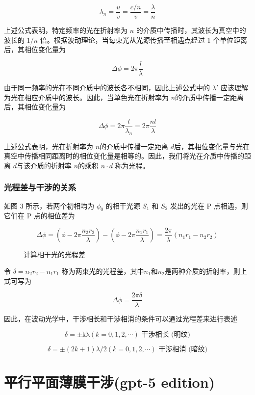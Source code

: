 \documentclass[withoutpreface,bwprint]{cumcmthesis} %
\begin{document}
\[\lambda_{n} = \frac{u}{v} = \frac{c/n}{v} = \frac{\lambda}{n}\]

上述公式表明，特定频率的光在折射率为 $n$ 的介质中传播时，其波长为真空中的波长的 $1/n$ 倍。根据波动理论，当每束光从光源传播至相遇点经过 1 个单位距离后，其相位变化量为


\[\Delta\phi = 2\pi\frac{l}{\lambda}\]

由于同一频率的光在不同介质中的波长各不相同，因此上述公式中的 $\lambda'$ 应该理解为光在相应介质中的波长。因此，当单色光在折射率为 $n$的介质中传播一定距离后，其相位变化量为

\[\Delta\phi = 2\pi\frac{l}{\lambda_{n}} = 2\pi\frac{nl}{\lambda}\]


上述公式表明，光在折射率为 $n$的介质中传播一定距离 $d$后，其相位变化量与光在真空中传播相同距离时的相位变化量是相等的。因此，我们将光在介质中传播的距离 $d$与该介质的折射率 $n$的乘积 $n\cdot d$ 称为光程。

\subsubsection{光程差与干涉的关系}

如图 3 所示，若两个初相均为 $\phi_0$ 的相干光源 $S_1$ 和 $S_2$ 发出的光在 P 点相遇，则它们在 P 点的相位差为

\[\Delta\phi = \left( \phi - 2\pi\frac{n_{2}r_{2}}{\lambda} \right) - \left( \phi - 2\pi\frac{n_{1}r_{1}}{\lambda} \right) = \frac{2\pi}{\lambda}\left( n_{1}r_{1} - n_{2}r_{2} \right)\]

\begin{figure}[ht]
    \centering
    \fbox{\rule{2cm}{0pt} \rule{0pt}{2cm}} %
    \caption{计算相干光的光程差}
    \label{fig:3}
\end{figure}
令 $\delta = n_2 r_2 - n_1 r_1$ 称为两束光的光程差，其中$n_1$和$n_2$是两种介质的折射率，则上式可写为


\[\Delta\phi = \frac{2 \pi\delta }{\lambda}\]


因此，在波动光学中，干涉相长和干涉相消的条件可以通过光程差来进行表述

\[\delta = \pm \text{kλ}(k = 0,1,2,\cdots)\text{~}\text{干涉相长}\text{\ (}\text{明纹}\text{)}\]

\[\delta = \pm (2k + 1)\lambda/2(k = 0,1,2,\cdots)\text{~}\text{干涉相消}\text{\ (}\text{暗纹}\text{)}\]



\section{平行平面薄膜干涉(gpt-5 edition)}
\end{document}
